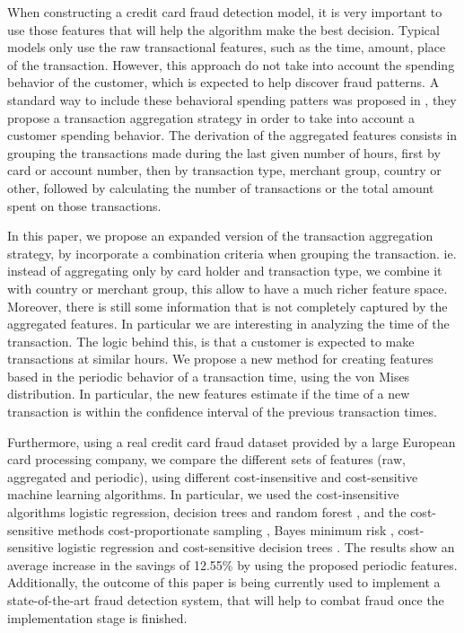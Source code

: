 	When constructing a credit card fraud detection model, it is very important to use those features 
	that will help the algorithm make the best decision. Typical models only use the raw 
	transactional features, such as the time, amount, place of the transaction. However, this 
approach 
	do not take into account the spending behavior of the customer, which is expected to help 
	discover fraud patterns. A standard way to include these behavioral spending patters was proposed 
	in \citep{Whitrow2008}, they propose a transaction aggregation strategy in order to take into 
	account a customer spending behavior. The derivation of the aggregated features consists in 
	grouping the transactions made during the last given number of hours, first by card or account 
	number, then by transaction type, merchant group, country or other, followed by calculating
	the number of transactions or the total amount spent on those transactions.
	
	In this paper, we propose an expanded version of the transaction aggregation strategy, by 
	incorporate a combination criteria when grouping the transaction. ie. instead of aggregating only 
	by card holder and transaction type, we combine it with country or merchant group, this allow to 
	have a much richer feature space. Moreover, there is still some information that is not 
	completely captured by the aggregated features. In particular we are interesting in analyzing the 
	time of the transaction. The logic behind this, is that a customer is expected to make 
	transactions at similar hours. We propose a new method for creating features  based in the 
	periodic behavior of a transaction time, using the von Mises distribution. In particular, the new 
	features estimate if the time of a new transaction is within the confidence interval of the 
	previous transaction times. 
	
	Furthermore, using a real credit card fraud dataset provided by a large European card processing 
	company, we compare the different sets of 	features (raw, aggregated and periodic), using 
	different cost-insensitive and 	cost-sensitive machine learning algorithms. In particular, we 
	used the cost-insensitive algorithms logistic regression, decision trees and random forest 
	\citep{Hastie2009}, and the 	cost-sensitive methods 	cost-proportionate sampling 
	\citep{Elkan2001,Zadrozny2003}, Bayes minimum 	risk 	\citep{CorreaBahnsen2013}, cost-sensitive 
	logistic regression \citep{CorreaBahnsen2014b} 	and 	cost-sensitive decision trees 
	\citep{CorreaBahnsen2015}. The results show an average increase in the savings of 12.55\% by 
using 
	the proposed periodic features. Additionally, the outcome of this paper is being currently used 
	to implement a state-of-the-art fraud detection 	system, that will  help to combat 	fraud once 
	the implementation stage is finished. 


